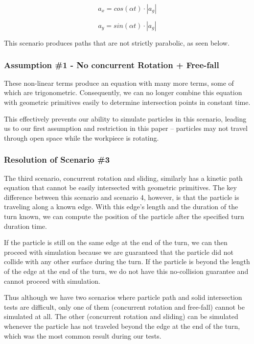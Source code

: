 $$
a_x = cos(\alpha t) \cdot |a_g|
$$

$$
a_y = sin(\alpha t) \cdot |a_g|
$$

This scenario produces paths that are not strictly parabolic, as seen below.


		\subsubsection{Assumption \#1 - No concurrent Rotation + Free-fall}

These non-linear terms produce an equation with many more terms, some of which are trigonometric. Consequently, we can no longer combine this equation with geometric primitives easily to determine intersection points in constant time.

This effectively prevents our ability to simulate particles in this scenario, leading us to our first assumption and restriction in this paper -- particles may not travel through open space while the workpiece is rotating.

		\subsubsection{Resolution of Scenario \#3}

The third scenario, concurrent rotation and sliding, similarly has a kinetic path equation that cannot be easily intersected with geometric primitives. The key difference between this scenario and scenario 4, however, is that the particle is traveling along a known edge. With this edge's length and the duration of the turn known, we can compute the position of the particle after the specified turn duration time.

If the particle is still on the same edge at the end of the turn, we can then proceed with simulation because we are guaranteed that the particle did not collide with any other surface during the turn. If the particle is beyond the length of the edge at the end of the turn, we do not have this no-collision guarantee and cannot proceed with simulation.

Thus although we have two scenarios where particle path and solid intersection tests are difficult, only one of them (concurrent rotation and free-fall) cannot be simulated at all. The other (concurrent rotation and sliding) can be simulated whenever the particle has not traveled beyond the edge at the end of the turn, which was the most common result during our tests.


